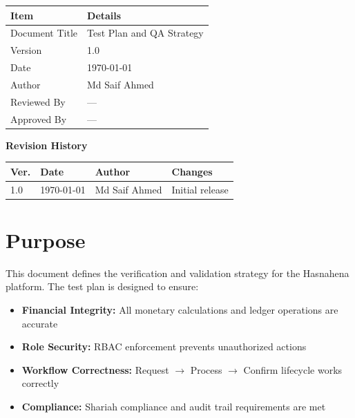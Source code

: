 \documentclass[11pt,a4paper]{article}
\newcommand{\DocumentTitle}{Test Plan and QA Strategy}
\newcommand{\DocumentVersion}{1.0}
\newcommand{\DocumentDate}{\today}
\begin{document}
\begin{tabular}{@{}p{3cm}p{10cm}@{}}
\toprule
\textbf{Item} & \textbf{Details} \\
\midrule
Document Title & \DocumentTitle \\
Version & \DocumentVersion \\
Date & \DocumentDate \\
Author & Md Saif Ahmed \\
Reviewed By & --- \\
Approved By & --- \\
\bottomrule
\end{tabular}

\vspace{1em}

\textbf{Revision History}

\begin{tabular}{@{}p{1.2cm}p{2.5cm}p{3.5cm}p{5.5cm}@{}}
\toprule
\textbf{Ver.} & \textbf{Date} & \textbf{Author} & \textbf{Changes} \\
\midrule
1.0 & \DocumentDate & Md Saif Ahmed & Initial release \\
\bottomrule
\end{tabular}

\newpage

\section{Purpose}

This document defines the verification and validation strategy for the Hasnahena platform. The test plan is designed to ensure:
\begin{itemize}
    \item \textbf{Financial Integrity:} All monetary calculations and ledger operations are accurate
    \item \textbf{Role Security:} RBAC enforcement prevents unauthorized actions
    \item \textbf{Workflow Correctness:} Request $\rightarrow$ Process $\rightarrow$ Confirm lifecycle works correctly
    \item \textbf{Compliance:} Shariah compliance and audit trail requirements are met
\end{itemize}

\end{document}
